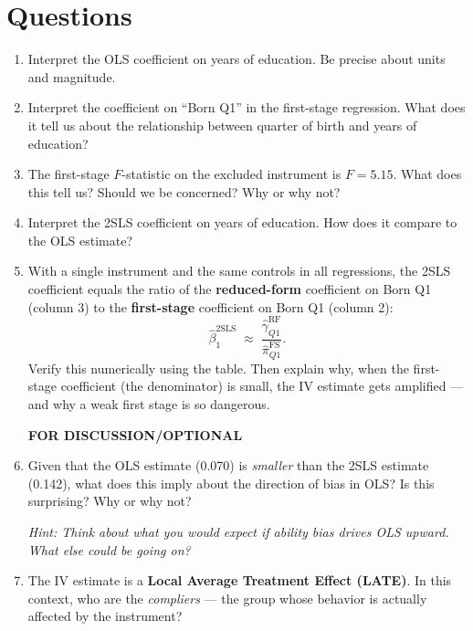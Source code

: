 \documentclass[11pt]{article}
\begin{document}
\newpage

\section*{Questions}

\begin{enumerate}

\item Interpret the OLS coefficient on years of education. Be precise about units and magnitude.
\vspace{1.5cm}


\item Interpret the coefficient on ``Born Q1'' in the first-stage regression. What does it tell us about the relationship between quarter of birth and years of education?
\vspace{2.2cm}


\item The first-stage $F$-statistic on the excluded instrument is $F = 5.15$. What does this tell us? Should we be concerned? Why or why not?

\vspace{2.2cm}



\item Interpret the 2SLS coefficient on years of education. How does it compare to the OLS estimate?

\vspace{2.2cm}

\item With a single instrument and the same controls in all regressions, the 2SLS coefficient equals the ratio of the \textbf{reduced-form} coefficient on Born Q1 (column 3) to the \textbf{first-stage} coefficient on Born Q1 (column 2):
\[
\hat{\beta}_1^{\text{2SLS}} \;\approx\; \frac{\hat{\gamma}_{Q1}^{\text{RF}}}{\hat{\pi}_{Q1}^{\text{FS}}}.
\]
Verify this numerically using the table. Then explain why, when the first-stage coefficient (the denominator) is small, the IV estimate gets amplified --- and why a weak first stage is so dangerous.
\clearpage

{\centering\large{\textbf{FOR DISCUSSION/OPTIONAL}}}

\vspace{1cm}

\item  Given that the OLS estimate (0.070) is \textit{smaller} than the 2SLS estimate (0.142), what does this imply about the direction of bias in OLS? Is this surprising? Why or why not?

\textit{Hint: Think about what you would expect if ability bias drives OLS upward. What else could be going on?}

\vspace{3cm}


\item The IV estimate is a \textbf{Local Average Treatment Effect (LATE)}. In this context, who are the \textit{compliers} --- the group whose behavior is actually affected by the instrument?

\vspace{2.2cm}

\end{enumerate}
\end{document}
